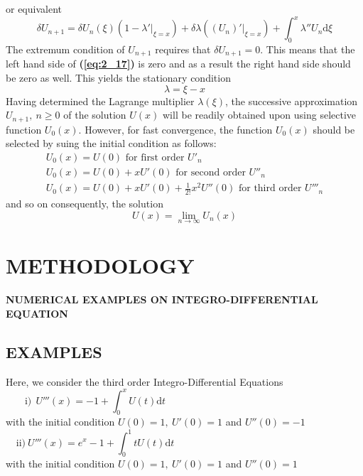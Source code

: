 \documentclass[12pt]{report}
\newcommand{\bt}[1]{\textbf{#1}}
\newcommand{\refn}[1]{\textbf{(\ref{#1})}}
\newcommand{\IDEs}{Integro-Differential Equations}
\begin{document}
	or equivalent
	\begin{equation}
		\delta U_{n+1} = \delta U_n(\xi)(1-\lambda'|_{\xi = x}) + \delta \lambda((U_n)'|_{\xi = x}) + \int_{0}^{x}\lambda''U_n\text{d}\xi \label{eq:2_17}
	\end{equation}
	The extremum condition of $U_{n+1}$ requires that $\delta U_{n+1} = 0$. This means that the left hand side of \refn{eq:2_17} is zero and as a result the right hand side should be zero as well. This yields the stationary condition 
	\begin{equation*}
		\lambda = \xi - x
	\end{equation*}
	Having determined the Lagrange multiplier $\lambda(\xi)$, the successive approximation $U_{n+1}, ~ n\geq 0$ of the solution $U(x)$ will be readily obtained upon using selective function $U_0(x)$. However, for fast convergence, the function $U_0(x)$ should be selected by suing the initial condition as follows:
	\begin{equation}
		\begin{array}{l}
			U_0(x) = U(0) \text{ for first order } U'_n \\
			U_0(x) = U(0) + xU'(0) \text{ for second order } U''_n\\
			U_0(x) = U(0) + xU'(0) +\frac{1}{2!}x^2U''(0) \text{ for third order } U'''_n
		\end{array}
		\label{eq:2_18}
	\end{equation}
	and so on consequently, the solution
	\begin{equation}
		U(x) = \lim\limits_{n\rightarrow \infty}U_n(x)
	\end{equation}
	
	
	\chapter{METHODOLOGY}
	\bt{\Large NUMERICAL EXAMPLES ON INTEGRO-DIFFERENTIAL EQUATION}
	
	\section{EXAMPLES}
	Here, we consider the third order \IDEs
	\begin{equation}
		\text{i)}~~ U'''(x) =  -1 + \int_{0}^{x}U(t)\text{d}t\qquad\qquad\qquad\qquad\qquad\qquad\qquad\qquad\qquad \label{eq:3_1}
	\end{equation}
	with the initial condition $U(0)=1, ~ U'(0)=1$ and $U''(0)=-1$
	\begin{equation}
		\text{ii)}~ U'''(x) =  e^x - 1 + \int_{0}^{1}tU(t)\text{d}t\qquad\qquad\qquad\qquad\qquad\qquad\qquad\qquad\qquad \label{eq:3_2}
	\end{equation}
	with the initial condition $U(0)=1, ~ U'(0)=1$ and $U''(0)=1$\\
	
\end{document}
